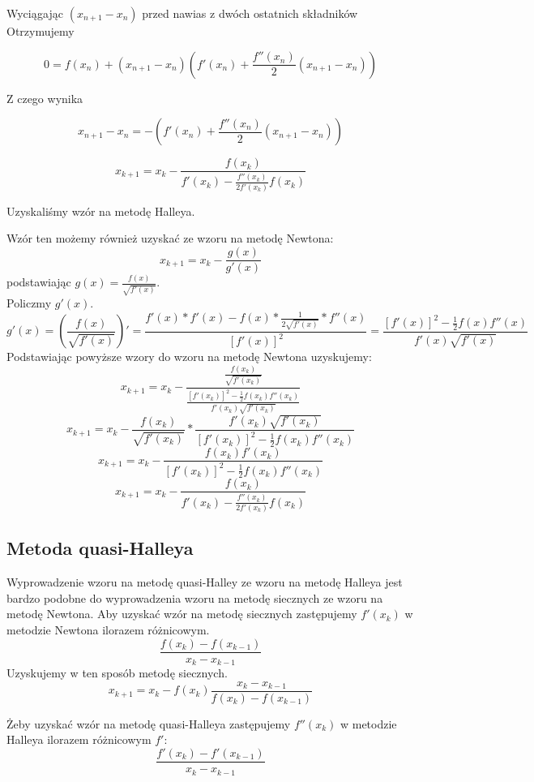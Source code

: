 \documentclass[11pt,a4paper]{article}
\begin{document}
    Wyciągając $(x_{n+1}-x_n)$ przed nawias z dwóch ostatnich składników Otrzymujemy

    $$
        0 = f(x_n) + (x_{n+1}-x_n)\left(f'(x_n)+\frac{f''(x_n)}{2}(x_{n+1}-x_n)\right)
    $$

    Z czego wynika

    $$
        x_{n+1} - x_n = -\left(f'(x_n)+\frac{f''(x_n)}{2}(x_{n+1}-x_n)\right)
    $$

    $$
        x_{k+1} = x_k - \frac{f(x_k)}{f'(x_k) - \frac{f''(x_k)}{2f'(x_k)}f(x_k)}
    $$

    Uzyskaliśmy wzór na metodę Halleya.

    Wzór ten możemy również uzyskać ze wzoru na metodę Newtona:
    $$
        x_{k+1}= x_k - \frac{g(x)}{g'(x)}
    $$
    podstawiając $g(x) = \frac{f(x)}{\sqrt{f'(x)}}$.\\
    Policzmy $g'(x)$.
    $$
        g'(x) = \left(\frac{f(x)}{\sqrt{f'(x)}}\right)' = \frac{f'(x)*f'(x) - f(x)*\frac{1}{2\sqrt{f'(x)}}*f''(x)}{[f'(x)]^2} = \frac{[f'(x)]^2-\frac{1}{2}f(x)f''(x)}{f'(x)\sqrt{f'(x)}}
    $$
    Podstawiając powyższe wzory do wzoru na metodę Newtona uzyskujemy:
    $$
        x_{k+1} = x_k - \frac{\frac{f(x_k)}{\sqrt{f'(x_k)}}}{\frac{[f'(x_k)]^2 - \frac{1}{2}f(x_k)f''(x_k)}{f'(x_k)\sqrt{f'(x_k)}}}
    $$
    $$
        x_{k+1} = x_k - \frac{f(x_k)}{\sqrt{f'(x_k)}} * \frac{f'(x_k)\sqrt{f'(x_k)}}{[f'(x_k)]^2 - \frac{1}{2}f(x_k)f''(x_k)}
    $$
    $$
        x_{k+1} = x_k - \frac{f(x_k)f'(x_k)}{[f'(x_k)]^2 - \frac{1}{2}f(x_k)f''(x_k)}
    $$
    $$
        x_{k+1} = x_k - \frac{f(x_k)}{f'(x_k) - \frac{f''(x_k)}{2f'(x_k)}f(x_k)}
    $$

    \subsection{Metoda quasi-Halleya}
    Wyprowadzenie wzoru na metodę quasi-Halley ze wzoru na metodę Halleya jest bardzo podobne do wyprowadzenia wzoru na metodę siecznych ze wzoru na metodę Newtona. Aby uzyskać wzór na metodę siecznych zastępujemy $f'(x_k)$ w metodzie Newtona ilorazem różnicowym.
    $$
        \frac{f(x_k) - f(x_{k-1})}{x_k - x_{k-1}}
    $$
    Uzyskujemy w ten sposób metodę siecznych.
    $$
        x_{k+1} = x_k - f(x_k)\frac{x_k - x_{k-1}}{f(x_k) - f(x_{k-1})}
    $$

    Żeby uzyskać wzór na metodę quasi-Halleya zastępujemy $f''(x_k)$ w metodzie Halleya ilorazem różnicowym $f'$:
    $$
        \frac{f'(x_k) - f'(x_{k-1})}{x_k - x_{k-1}}
    $$
\end{document}
